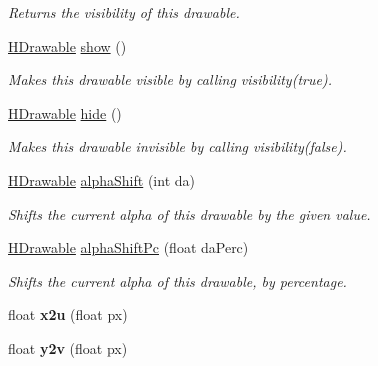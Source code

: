 \begin{DoxyCompactItemize}
\begin{DoxyCompactList}\small\item\em Returns the visibility of this drawable. \end{DoxyCompactList}\item 
\hyperlink{classhype_1_1core_1_1drawable_1_1_h_drawable}{H\-Drawable} \hyperlink{classhype_1_1core_1_1drawable_1_1_h_drawable_acab0f90892d84b754e9cc769ba9dc177}{show} ()
\begin{DoxyCompactList}\small\item\em Makes this drawable visible by calling {\ttfamily visibility(true)}. \end{DoxyCompactList}\item 
\hyperlink{classhype_1_1core_1_1drawable_1_1_h_drawable}{H\-Drawable} \hyperlink{classhype_1_1core_1_1drawable_1_1_h_drawable_a39dff6aef37343a177538d61ae751fb3}{hide} ()
\begin{DoxyCompactList}\small\item\em Makes this drawable invisible by calling {\ttfamily visibility(false)}. \end{DoxyCompactList}\item 
\hyperlink{classhype_1_1core_1_1drawable_1_1_h_drawable}{H\-Drawable} \hyperlink{classhype_1_1core_1_1drawable_1_1_h_drawable_a79d1c2ca4a8f1744b1625907213db1c6}{alpha\-Shift} (int da)
\begin{DoxyCompactList}\small\item\em Shifts the current alpha of this drawable by the given value. \end{DoxyCompactList}\item 
\hyperlink{classhype_1_1core_1_1drawable_1_1_h_drawable}{H\-Drawable} \hyperlink{classhype_1_1core_1_1drawable_1_1_h_drawable_acee05e5733f918b5899a651cd8c7e1bf}{alpha\-Shift\-Pc} (float da\-Perc)
\begin{DoxyCompactList}\small\item\em Shifts the current alpha of this drawable, by percentage. \end{DoxyCompactList}\item 
\hypertarget{classhype_1_1core_1_1drawable_1_1_h_drawable_aefc0cf9066fe2bf147a4178b7c6bf192}{float {\bfseries x2u} (float px)}\label{classhype_1_1core_1_1drawable_1_1_h_drawable_aefc0cf9066fe2bf147a4178b7c6bf192}

\item 
\hypertarget{classhype_1_1core_1_1drawable_1_1_h_drawable_a55e521bfb4597201ad1bf2ab4857e613}{float {\bfseries y2v} (float px)}\label{classhype_1_1core_1_1drawable_1_1_h_drawable_a55e521bfb4597201ad1bf2ab4857e613}


\end{DoxyCompactItemize}
